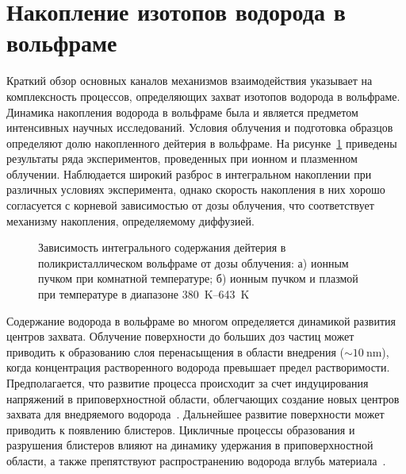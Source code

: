 \section{Накопление изотопов водорода в вольфраме}\label{sec:ch1/sec5}

Краткий обзор основных каналов механизмов взаимодействия указывает на комплексность процессов, определяющих захват изотопов водорода в вольфраме. Динамика накопления водорода в вольфраме была и является предметом интенсивных научных исследований. Условия облучения и подготовка образцов определяют долю накопленного дейтерия в вольфраме. На рисунке~\cref{fig:ch1/retention_fluence} приведены результаты ряда экспериментов, проведенных при ионном и плазменном облучении. Наблюдается широкий разброс в интегральном накоплении при различных условиях эксперимента, однако скорость накопления в них хорошо согласуется с корневой зависимостью от дозы облучения, что соответствует механизму накопления, определяемому диффузией.  

\begin{figure}[ht]
    \caption{Зависимость интегрального содержания дейтерия в поликристаллическом вольфраме от дозы облучения: а) ионным пучком при комнатной температуре; б) ионным пучком и плазмой при температуре в диапазоне \SIrange{380}{643}{\kelvin}~\cite{HarutunyanThesis}}\label{fig:ch1/retention_fluence}
\end{figure}

Содержание водорода в вольфраме во многом определяется динамикой развития центров захвата. Облучение поверхности до больших доз частиц может приводить к образованию слоя перенасыщения в области внедрения (\( \sim \SI{10}{\nano\meter} \)), когда концентрация растворенного водорода превышает предел растворимости. Предполагается, что развитие процесса происходит за счет индуцирования напряжений в приповерхностной области, облегчающих создание новых центров захвата для внедряемого водорода~\cite{Nishijima2023}. Дальнейшее развитие поверхности может приводить к появлению блистеров. Цикличные процессы образования и разрушения блистеров влияют на динамику удержания в приповерхностной области, а также препятствуют распространению водорода вглубь материала~\cite{Bauer2017}.  

